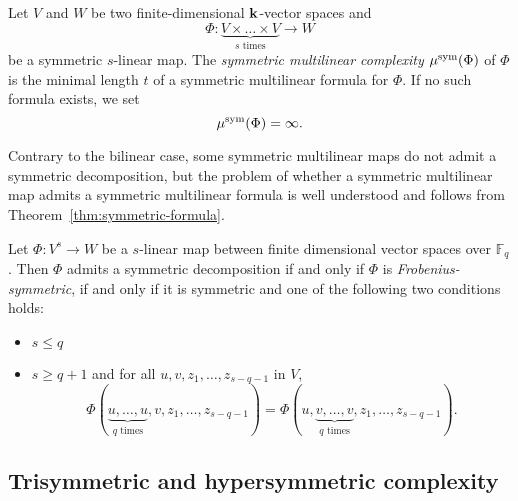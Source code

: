 \begin{defi}
Let $V$ and $W$ be two finite-dimensional $\mathbf{k}$-vector
spaces and
\[
  \Phi:\underset{\textrm{$s$ times}}{\underbrace{V\times\dots\times V}}\to W
\]
be a symmetric $s$-linear map. The \emph{symmetric multilinear complexity}
$\mu^{\textrm{sym}}(\Phi)$ of $\Phi$ is the minimal length $t$ of a symmetric multilinear
formula for $\Phi$. If no such formula exists, we set 
\[
  \mu^{\textrm{sym}}(\Phi) = \infty.
\]
\end{defi}
Contrary to the bilinear case, some symmetric multilinear maps do not admit a symmetric
decomposition, but the problem of whether a symmetric multilinear map admits
a symmetric multilinear formula is well understood and follows from
Theorem~\ref{thm:symmetric-formula}.
\begin{thm}\label{th:criterion}
\label{thm:symmetric-formula}
Let $\Phi:V^s\to W$ be a $s$-linear map between finite dimensional vector spaces over $\mathbb{F}_q$.
Then $\Phi$ admits a symmetric decomposition if and only if $\Phi$ is \emph{Frobenius-symmetric},
\ie if and only if it is symmetric and one of the following two conditions holds:
\begin{itemize}
\item $s\leq q$
\item $s\geq q+1$ and for all $u,v,z_1,\dots,z_{s-q-1}$ in $V$,
\[
\Phi(\underset{\textrm{$q$ times}}{\underbrace{u,\dots,u}},v,z_1,\dots,z_{s-q-1})=\Phi(u,\underset{\textrm{$q$ times}}{\underbrace{v,\dots,v}},z_1,\dots,z_{s-q-1}).
\]
\end{itemize}
\end{thm}

\subsection{Trisymmetric and hypersymmetric complexity}
\label{subsec:trisym}

